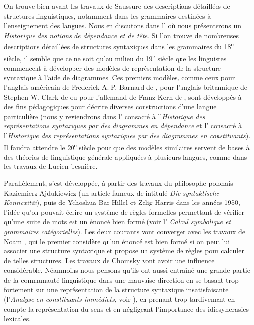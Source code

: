 {    On trouve bien avant les travaux de Saussure des descriptions détaillées de structures linguistiques, notamment dans les grammaires destinées à l’enseignement des langues. Nous en discutons dans l’ où nous présenterons un \textit{Historique des notions de dépendance et de tête}. Si l’on trouve de nombreuses descriptions détaillées de structures syntaxiques dans les grammaires du 18\textsuperscript{e} siècle, il semble que ce ne soit qu’au milieu du 19\textsuperscript{e} siècle que les linguistes commencent à développer des modèles de représentation de la structure syntaxique à l’aide de diagrammes. Ces premiers modèles, comme ceux pour l’anglais américain de Frederick A. P. Barnard de \citeyear{barnard1836analytic}, pour l’anglais britannique de Stephen W. Clark de \citeyear{Clark1847} ou pour l’allemand de Franz Kern de \citeyear{kern1883zur}, sont développés à des fins pédagogiques pour décrire diverses constructions d’une langue particulière (nous y reviendrons dans l’ consacré à l’\textit{Historique des représentations syntaxiques par des diagrammes en dépendance} et l’ consacré à l’\textit{Historique des représentations syntaxiques par des diagrammes en constituants}). Il faudra attendre le 20\textsuperscript{e} siècle pour que des modèles similaires servent de bases à des théories de linguistique générale appliquées à plusieurs langues, comme dans les travaux de Lucien Tesnière.

    Parallèlement, s’est développée, à partir des travaux du philosophe polonais Kaziemierz Ajdukiewicz (un article fameux de \citeyear{ajduckiewicz1935syntaktische} intitulé \textit{Die syntaktische Konnexität}), puis de Yehoshua Bar-Hillel et Zelig Harris dans les années 1950, l’idée qu’on pouvait écrire un système de règles formelles permettant de vérifier qu’une suite de mots est un énoncé bien formé (voir l’ \textit{Calcul symbolique et grammaires catégorielles}). Les deux courants vont converger avec les travaux de Noam \cite{chomsky1957syntactic}, qui le premier considère qu’un énoncé est bien formé si on peut lui associer une structure syntaxique et propose un système de règles pour calculer de telles structures. Les travaux de Chomsky vont avoir une influence considérable. Néanmoins nous pensons qu’ils ont aussi entraîné une grande partie de la communauté linguistique dans une mauvaise direction en se basant trop fortement sur une représentation de la structure syntaxique insatisfaisante (l’\textit{Analyse en constituants immédiats}, voir ), en prenant trop tardivement en compte la représentation du sens et en négligeant l’importance des idiosyncrasies lexicales.
}
